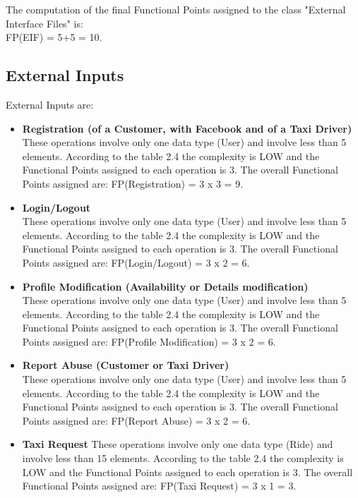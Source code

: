 \documentclass[../../../../projectPlan.tex]{subfiles}
\begin{document}
			The computation of the final Functional Points assigned to the class "External Interface Files" is:\\
			FP(EIF) = 5+5 = 10.

		\subsection{External Inputs}
			External Inputs are:
			\begin{itemize}
				\item \textbf{Registration (of a Customer, with Facebook and of a Taxi Driver)}\\
				      These operations involve only one data type (User) and involve less than 5 elements.
				      According to the table 2.4 the complexity is LOW and the Functional Points assigned to each operation is 3.
				      The overall Functional Points assigned are: FP(Registration) = 3 x 3 = 9.

				\item \textbf{Login/Logout} \\
				      These operations involve only one data type (User) and involve less than 5 elements.
				      According to the table 2.4 the complexity is LOW and the Functional Points assigned to each operation is 3.
				      The overall Functional Points assigned are: FP(Login/Logout) = 3 x 2 = 6.

				\item \textbf{Profile Modification (Availability or Details modification)} \\
				      These operations involve only one data type (User) and involve less than 5 elements.
				      According to the table 2.4 the complexity is LOW and the Functional Points assigned to each operation is 3.
				      The overall Functional Points assigned are: FP(Profile Modification) = 3 x 2 = 6.

				\item \textbf{Report Abuse (Customer or Taxi Driver)} \\
                      These operations involve only one data type (User) and involve less than 5 elements.
				      According to the table 2.4 the complexity is LOW and the Functional Points assigned to each operation is 3.
				      The overall Functional Points assigned are: FP(Report Abuse) = 3 x 2 = 6.

				\item \textbf{Taxi Request}
				      These operations involve only one data type (Ride) and involve less than 15 elements.
				      According to the table 2.4 the complexity is LOW and the Functional Points assigned to each operation is 3.
				      The overall Functional Points assigned are: FP(Taxi Request) = 3 x 1 = 3.


\end{itemize}
\end{document}
